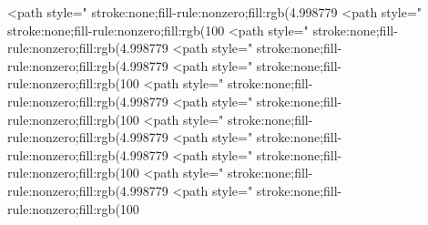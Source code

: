 <path style=" stroke:none;fill-rule:nonzero;fill:rgb(4.998779%
<path style=" stroke:none;fill-rule:nonzero;fill:rgb(100%
<path style=" stroke:none;fill-rule:nonzero;fill:rgb(4.998779%
<path style=" stroke:none;fill-rule:nonzero;fill:rgb(4.998779%
<path style=" stroke:none;fill-rule:nonzero;fill:rgb(100%
<path style=" stroke:none;fill-rule:nonzero;fill:rgb(4.998779%
<path style=" stroke:none;fill-rule:nonzero;fill:rgb(100%
<path style=" stroke:none;fill-rule:nonzero;fill:rgb(4.998779%
<path style=" stroke:none;fill-rule:nonzero;fill:rgb(4.998779%
<path style=" stroke:none;fill-rule:nonzero;fill:rgb(100%
<path style=" stroke:none;fill-rule:nonzero;fill:rgb(4.998779%
<path style=" stroke:none;fill-rule:nonzero;fill:rgb(100%

